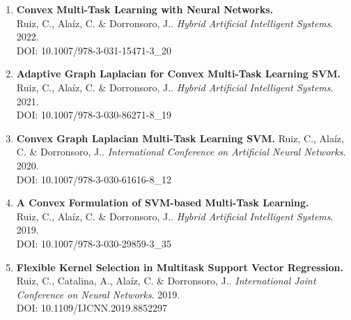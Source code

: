 \begin{enumerate}
    \item \textbf{Convex Multi-Task Learning with Neural Networks.}\\
    {Ruiz, C.}, Alaíz, C. \& Dorronsoro, J.. 
    \emph{Hybrid Artificial Intelligent Systems}. 2022.\\
    DOI: 10.1007/978-3-031-15471-3\_20\\
    \item \textbf{Adaptive Graph Laplacian for Convex Multi-Task Learning SVM.}\\
    {Ruiz, C.}, Alaíz, C. \& Dorronsoro, J.. 
    \emph{Hybrid Artificial Intelligent Systems}. 2021.\\
    DOI: 10.1007/978-3-030-86271-8\_19\\
    \item \textbf{Convex Graph Laplacian Multi-Task Learning SVM.}
    {Ruiz, C.}, Alaíz, C. \& Dorronsoro, J.. 
    \emph{International Conference on Artificial Neural Networks}. 2020.\\
    DOI: 10.1007/978-3-030-61616-8\_12\\
    \item \textbf{A Convex Formulation of SVM-based Multi-Task Learning.}\\
    {Ruiz, C.}, Alaíz, C. \& Dorronsoro, J.. 
    \emph{Hybrid Artificial Intelligent Systems}. 2019.\\
    DOI: 10.1007/978-3-030-29859-3\_35\\
    \item \textbf{Flexible Kernel Selection in Multitask
    Support Vector Regression.}\\
    Ruiz, C., Catalina, A., Alaíz, C. \& Dorronsoro, J.. 
    \emph{International Joint Conference on Neural Networks}. 2019.\\
    DOI: 10.1109/IJCNN.2019.8852297\\
\end{enumerate}
%
